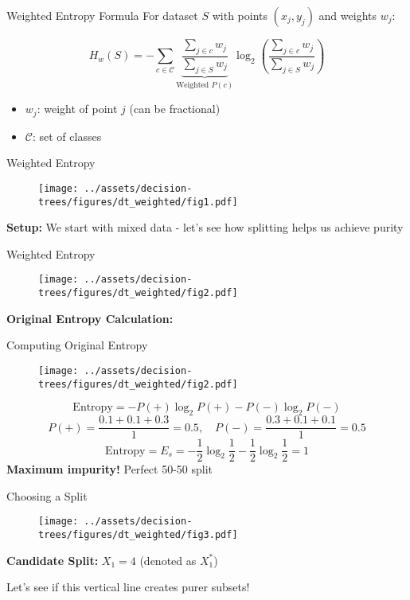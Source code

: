 \documentclass[usenames,dvipsnames]{beamer}
\begin{document}
\begin{frame}{Weighted Entropy Formula}
For dataset $S$ with points $(x_j, y_j)$ and weights $w_j$:

\[
H_w(S) = - \sum_{c \in \mathcal{C}} 
\underbrace{\frac{\sum_{j \in c} w_j}{\sum_{j \in S} w_j}}_{\text{Weighted }P(c)}
\log_2 \left( \frac{\sum_{j \in c} w_j}{\sum_{j \in S} w_j} \right)
\]

\begin{itemize}
\item $w_j$: weight of point $j$ (can be fractional)
\item $\mathcal{C}$: set of classes
\end{itemize}
\end{frame}


\begin{frame}{Weighted Entropy}
\begin{figure}
    \centering
    \texttt{[image: ../assets/decision-trees/figures/dt\_weighted/fig1.pdf]}
\end{figure}
\textbf{Setup:} We start with mixed data - let's see how splitting helps us achieve purity
\end{frame}

\begin{frame}{Weighted Entropy}
\begin{figure}
    \centering
    \texttt{[image: ../assets/decision-trees/figures/dt\_weighted/fig2.pdf]}
\end{figure}
\textbf{Original Entropy Calculation:}
\end{frame}
	
\begin{frame}{Computing Original Entropy}
\begin{figure}
    \centering
    \texttt{[image: ../assets/decision-trees/figures/dt\_weighted/fig2.pdf]}
\end{figure}
\small
$$\text{Entropy} = -P(+) \log_2 P(+) - P(-) \log_2 P(-)$$
$$P(+) = \frac{0.1 + 0.1 + 0.3}{1} = 0.5, \quad P(-) = \frac{0.3 + 0.1 + 0.1}{1} = 0.5$$
$$\text{Entropy} = E_s = -\frac{1}{2} \log_2 \frac{1}{2} - \frac{1}{2} \log_2 \frac{1}{2} = 1$$
\textbf{Maximum impurity!} Perfect 50-50 split
\end{frame}
	
\begin{frame}{Choosing a Split}
\begin{figure}
    \centering
    \texttt{[image: ../assets/decision-trees/figures/dt\_weighted/fig3.pdf]}
\end{figure}
\textbf{Candidate Split:} $X_1 = 4$ (denoted as $X_1^*$)

Let's see if this vertical line creates purer subsets!
\end{frame}
		
\end{document}
